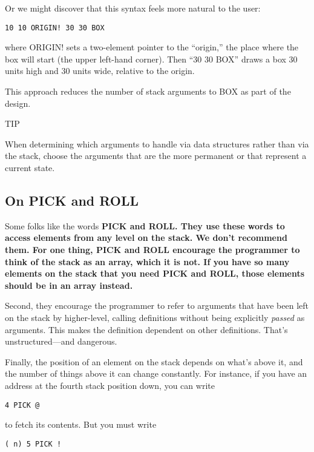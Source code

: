 Or we might discover that this syntax feels more natural to the
user:

\begin{verbatim}
10 10 ORIGIN! 30 30 BOX
\end{verbatim}

where ORIGIN! sets a two-element pointer to the ``origin,'' the place
where the box will start (the upper left-hand corner). Then ``30 30 BOX''
draws a box 30 units high and 30 units wide, relative to the origin.

This approach reduces the number of stack arguments to BOX as
part of the design.

TIP

When determining which arguments to handle via data structures rather
than via the stack, choose the arguments that are the more permanent or
that represent a current state.

\subsection{On PICK and ROLL}

Some folks like the words \bf{PICK} and \bf{ROLL}. They use these words to
access elements from any level on the stack. We don't recommend them.
For one thing, \bf{PICK} and \bf{ROLL} encourage the programmer to think
of the stack as an array, which it is not. If you have so many elements on
the stack that you need \bf{PICK} and \bf{ROLL}, those elements should be in
an array instead.

Second, they encourage the programmer to refer to arguments that
have been left on the stack by higher-level, calling definitions without
being explicitly \emph{passed} as arguments. This makes the definition
dependent on other definitions. That's unstructured---and dangerous.

Finally, the position of an element on the stack depends on what's
above it, and the number of things above it can change constantly. For
instance, if you have an address at the fourth stack position down, you can
write

\begin{verbatim}
4 PICK @
\end{verbatim}

to fetch its contents. But you must write

\begin{verbatim}
( n) 5 PICK !
\end{verbatim}

